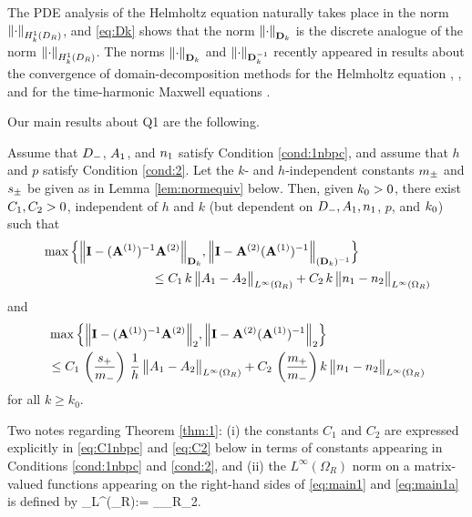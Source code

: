 The PDE analysis of the Helmholtz equation naturally takes place in the norm $\NHokDR{\cdot}$, and \eqref{eq:Dk} shows that the norm $\NDmatk{\cdot}$ is
the discrete analogue of the norm $\NHokDR{\cdot}$. %
The norms $\NDmatk{\cdot}$ and $\NDmatkI{\cdot}$ recently appeared in results about the convergence of domain-decomposition methods %
for the Helmholtz equation \cite{GrSpVa:17}, \cite{GrSpZo:18}, and for the time-harmonic Maxwell equations \cite{BoDoGrSpTo:17}. 

Our main results about Q1 are the following.

\begin{theorem}\label{thm:1}
Assume that $D_{-}$, $A_{1}$, and $n_{1}$ satisfy Condition \ref{cond:1nbpc}, and assume that $h$ and $p$ satisfy Condition \ref{cond:2}. 
Let the $k$- and $h$-independent constants $m_{\pm}$ and $s_{\pm}$ be given as in Lemma \ref{lem:normequiv} below.
Then, given $k_{0}>0$, there exist $C_{1}, C_{2}>0$, independent of $h$ and $k$ (but dependent on $D_{-}, A_{1}, n_{1}$, $p$, and $k_{0}$) such that
\begin{align}\nonumber
&\max\Big\{
\NDmatk{\Imat - (\Amat^{(1)})^{-1}\Amat^{(2)}}, 
\N{\Imat -\Amat^{(2)} (\Amat^{(1)})^{-1}}_{(\Dmat_k)^{-1}}
\Big\}\\
&\hspace{3cm} 
\leq C_1 \,k \,
\big\|\Ao-\At\big\|_{L^\infty(\Omega_R)} + C_2 \, k \, \big\|\no-\nt\big\|_{L^\infty(\Omega_R)}
\label{eq:main1}
\end{align}
and 
\begin{align}\nonumber
&\max\Big\{
\N{\Imat - (\Amat^{(1)})^{-1}\Amat^{(2)}}_2, 
\N{\Imat -\Amat^{(2)} (\Amat^{(1)})^{-1}}_2
\Big\}\\
&\hspace{0cm} 
\leq C_1 \,\left(\frac{s_+}{m_-}\right) \,\frac{1}{h} \,
\big\|\Ao-\At\big\|_{L^\infty(\Omega_R)} + C_2 \, \left(\frac{m_+}{m_-} \right)k \, \big\|\no-\nt\big\|_{L^\infty(\Omega_R)}
\label{eq:main1a}
\end{align}
for all $k\geq k_0$. 
\end{theorem}

Two notes regarding Theorem \ref{thm:1}: (i) the constants $C_1$ and $C_2$ are expressed explicitly in \eqref{eq:C1nbpc} and \eqref{eq:C2} below in terms of constants appearing in Conditions \ref{cond:1nbpc} and \ref{cond:2}, and (ii) the $L^\infty(\Omega_R)$ norm on a matrix-valued functions appearing on the right-hand sides of \eqref{eq:main1} and \eqref{eq:main1a} is defined by
\beqs
{}_{L^\infty(\Omega_R)}:= \esssup_{\bx\in\Omega_R}_2.
\eeqs

